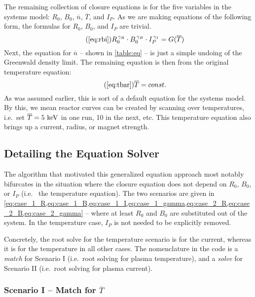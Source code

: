 The remaining collection of closure equations is for the five  variables in the systems model: $R_0$, $B_0$, $\overline n$, $\overline T$, and $I_P$. As we are making equations of the following form, the formulas for $R_0$, $B_0$, and $I_P$ are trivial.
\begin{equation}
	\tag{\ref{eq:rbi}}
	R_0^{\, \gamma_R} \cdot B_0^{\, \gamma_B} \cdot I_P^{\, \gamma_I} = G( \overline T )
\end{equation}
Next, the equation for $\overline n$ -- shown in \cref{table:eq} -- is just a simple undoing of the Greenwald density limit. The remaining equation is then from the original temperature equation:
\begin{equation}
	\tag{\ref{eq:tbar}}
	\overline T = const.
\end{equation}
As was assumed earlier, this is sort of a default equation for the systems model. By this, we mean reactor curves can be created by scanning over temperatures, i.e.\ set $\overline T = 5 \ \textnormal{keV}$ in one run, 10 in the next, etc. This temperature equation also brings up a  current, radius, or magnet strength. 

\subsection{Detailing the Equation Solver}

The algorithm that motivated this generalized equation approach most notably bifurcates in the situation where the closure equation does not depend on $R_0$, $B_0$, or $I_P$ (i.e.\  the temperature equation). The two scenarios are given in \cref{eq:case_1_R,eq:case_1_B,eq:case_1_I,eq:case_1_gamma,eq:case_2_R,eq:case_2_B,eq:case_2_gamma} -- where at least $R_0$ and $B_0$ are substituted out of the system. In the temperature case, $I_P$ is not needed to be explicitly removed.

Concretely, the root solve for the temperature  scenario is for the current, whereas it is for the temperature in all other cases. The nomenclature in the code is a \emph{match} for Scenario I (i.e.\ root solving for plasma temperature), and a \emph{solve} for Scenario II (i.e.\ root solving for plasma current).

\subsubsection{Scenario I -- Match for $\overline T$}

